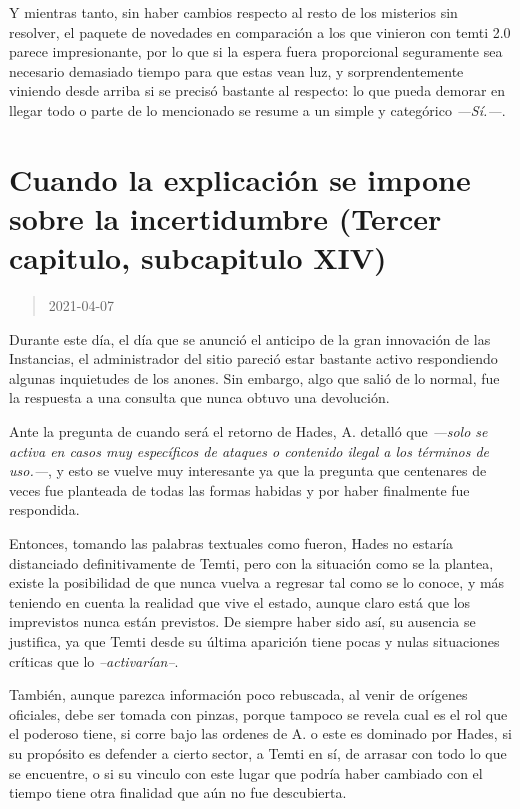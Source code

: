 \documentclass[
  spanish,
]{book}
\begin{document}
Y mientras tanto, sin haber cambios respecto al resto de los misterios sin resolver, el paquete de novedades en comparación a los que vinieron con temti 2.0 parece impresionante, por lo que si la espera fuera proporcional seguramente sea necesario demasiado tiempo para que estas vean luz, y sorprendentemente viniendo desde arriba si se precisó bastante al respecto: lo que pueda demorar en llegar todo o parte de lo mencionado se resume a un simple y categórico \emph{---Sí.---}.

\hypertarget{cuando-la-explicaciuxf3n-se-impone-sobre-la-incertidumbre-tercer-capitulo-subcapitulo-xiv}{%
\section{Cuando la explicación se impone sobre la incertidumbre (Tercer capitulo, subcapitulo XIV)}\label{cuando-la-explicaciuxf3n-se-impone-sobre-la-incertidumbre-tercer-capitulo-subcapitulo-xiv}}

\begin{quote}
2021-04-07
\end{quote}

Durante este día, el día que se anunció el anticipo de la gran innovación de las Instancias, el administrador del sitio pareció estar bastante activo respondiendo algunas inquietudes de los anones. Sin embargo, algo que salió de lo normal, fue la respuesta a una consulta que nunca obtuvo una devolución.

Ante la pregunta de cuando será el retorno de Hades, A. detalló que \emph{---solo se activa en casos muy específicos de ataques o contenido ilegal a los términos de uso.---}, y esto se vuelve muy interesante ya que la pregunta que centenares de veces fue planteada de todas las formas habidas y por haber finalmente fue respondida.

Entonces, tomando las palabras textuales como fueron, Hades no estaría distanciado definitivamente de Temti, pero con la situación como se la plantea, existe la posibilidad de que nunca vuelva a regresar tal como se lo conoce, y más teniendo en cuenta la realidad que vive el estado, aunque claro está que los imprevistos nunca están previstos.
De siempre haber sido así, su ausencia se justifica, ya que Temti desde su última aparición tiene pocas y nulas situaciones críticas que lo \emph{--activarían--}.

También, aunque parezca información poco rebuscada, al venir de orígenes oficiales, debe ser tomada con pinzas, porque tampoco se revela cual es el rol que el poderoso tiene, si corre bajo las ordenes de A. o este es dominado por Hades, si su propósito es defender a cierto sector, a Temti en sí, de arrasar con todo lo que se encuentre, o si su vinculo con este lugar que podría haber cambiado con el tiempo tiene otra finalidad que aún no fue descubierta.
\end{document}
